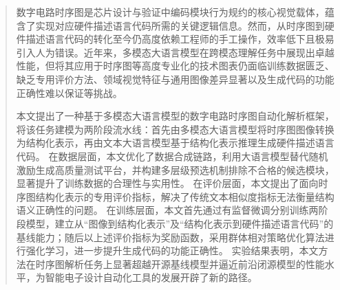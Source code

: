 

\begin{abstract}
  数字电路时序图是芯片设计与验证中编码模块行为规约的核心视觉载体，蕴含了实现对应硬件描述语言代码所需的关键逻辑信息。然而，从时序图到硬件描述语言代码的转化至今仍高度依赖工程师的手工操作，效率低下且极易引入人为错误。近年来，多模态大语言模型在跨模态理解任务中展现出卓越性能，但将其应用于时序图等高度专业化的技术图表仍面临训练数据匮乏、缺乏专用评价方法、领域视觉特征与通用图像差异显著以及生成代码的功能正确性难以保证等挑战。

  本文提出了一种基于多模态大语言模型的数字电路时序图自动化解析框架，将该任务建模为两阶段流水线：首先由多模态大语言模型将时序图图像转换为结构化表示，再由文本大语言模型基于结构化表示推理生成硬件描述语言代码。
  在数据层面，本文优化了数据合成链路，利用大语言模型替代随机激励生成高质量测试平台，并构建多层级预选机制排除不合格的候选模块，显著提升了训练数据的合理性与实用性。
  在评价层面，本文提出了面向时序图结构化表示的专用评价指标，解决了传统文本相似度指标无法衡量结构语义正确性的问题。
  在训练层面，本文首先通过有监督微调分别训练两阶段模型，建立从“图像到结构化表示”及“结构化表示到硬件描述语言代码”的基线能力；随后以上述评价指标为奖励函数，采用群体相对策略优化算法进行强化学习，进一步提升生成代码的功能正确性。
  实验结果表明，本文方法在时序图解析任务上显著超越开源基线模型并逼近前沿闭源模型的性能水平，为智能电子设计自动化工具的发展开辟了新的路径。

\end{abstract}

